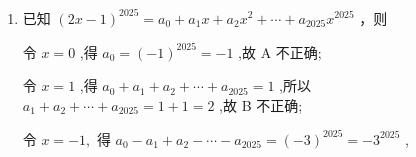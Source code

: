 \begin{enumerate}
\begin{enumerate}
\begin{jieda}
            令 $x = 1$ 可得 ${a}_{0} + {a}_{1} + {a}_{2} + {a}_{3} + {a}_{4} + {a}_{5} + {a}_{6} + {a}_{7} = 3$ ,
            
            令 $x =  - 1$ 可得 ${a}_{0} - {a}_{1} + {a}_{2} - {a}_{3} + {a}_{4} - {a}_{5} + {a}_{6} - {a}_{7} =  - {3}^{6} =  - {729}$ ,
            
            所以 ${a}_{0} + {a}_{2} + {a}_{4} + {a}_{6} = \dfrac{3 - {729}}{2} =  - {363},{a}_{1} + {a}_{3} + {a}_{5} + {a}_{7} = \dfrac{3 - \left( {-{729}}\right) }{2} = {366}$ ,
            
            又 $\left( {1 + {2x}}\right) {\left( 2 - x\right) }^{6} = {\left( 2 - x\right) }^{6} + {2x}{\left( 2 - x\right) }^{6}$ ,
            
            其中 ${\left( 2 - x\right) }^{6}$ 展开式的通项为 ${T}_{r + 1} = {2}^{6 - r}{{C}}_{6}^{r}{\left( -x\right) }^{r} = {2}^{6 - r}{\left( -1\right) }^{r}{{C}}_{6}^{r}{x}^{r}\left( {0 \leq  r \leq  6\text{ 且 }r \in  {N}}\right)$ ,
            
            所以 ${a}_{6} = {2}^{0}{{C}}_{6}^{6} + 2 \times  {2}^{1}{{C}}_{6}^{5} \times  {\left( -1\right) }^{5} =  - {23}$ ,
            
            所以 ${a}_{0} + {a}_{2} + {a}_{4} =  - {363} - {a}_{6} =  - {363} + {23} =  - {340}$ ,
            
            所以 $\dfrac{{a}_{0} + {a}_{2} + {a}_{4}}{{a}_{1} + {a}_{3} + {a}_{5} + {a}_{7}} = \dfrac{-{340}}{366} =  - \dfrac{170}{183}$ .
        \end{jieda}
        \item 已知 ${(2x - 1)}^{2025} = {a}_{0} + {a}_{1}x + {a}_{2}{x}^{2} + \cdots  + {a}_{2025}{x}^{2025}$ ，则
        \begin{jieda}
            令 $x = 0$ ,得 ${a}_{0} = {\left( -1\right) }^{2025} =  - 1$ ,故 A 不正确;
            
            令 $x = 1$ ,得 ${a}_{0} + {a}_{1} + {a}_{2} + \cdots  + {a}_{2025} = 1$ ,所以 ${a}_{1} + {a}_{2} + \cdots  + {a}_{2025} = 1 + 1 = 2$ ,故 B 不正确;
            
            令 $x =  - 1,$ 得 ${a}_{0} - {a}_{1} + {a}_{2} - \cdots  - {a}_{2025} = {\left( -3\right) }^{2025} =  - {3}^{2025}$ ,
            

\end{jieda}
\end{enumerate}
\end{enumerate}
